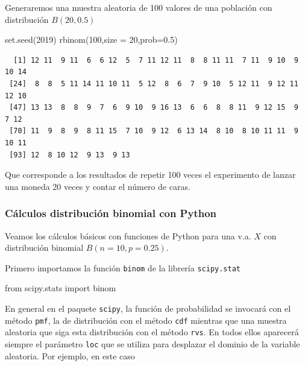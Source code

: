 \documentclass[
  letterpaper,
  DIV=11,
  numbers=noendperiod]{scrreprt}
\newenvironment{Shaded}{\begin{snugshade}}{\end{snugshade}}
\newcommand{\AttributeTok}[1]{\textcolor[rgb]{0.40,0.45,0.13}{#1}}
\newcommand{\DecValTok}[1]{\textcolor[rgb]{0.68,0.00,0.00}{#1}}
\newcommand{\FloatTok}[1]{\textcolor[rgb]{0.68,0.00,0.00}{#1}}
\newcommand{\FunctionTok}[1]{\textcolor[rgb]{0.28,0.35,0.67}{#1}}
\newcommand{\ImportTok}[1]{\textcolor[rgb]{0.00,0.46,0.62}{#1}}
\newcommand{\NormalTok}[1]{\textcolor[rgb]{0.00,0.23,0.31}{#1}}
\begin{document}
Generaremos una muestra aleatoria de 100 valores de una población con
distribución \(B(20,0.5)\)

\begin{Shaded}
\begin{Highlighting}[]
\FunctionTok{set.seed}\NormalTok{(}\DecValTok{2019}\NormalTok{)}
\FunctionTok{rbinom}\NormalTok{(}\DecValTok{100}\NormalTok{,}\AttributeTok{size =} \DecValTok{20}\NormalTok{,}\AttributeTok{prob=}\FloatTok{0.5}\NormalTok{)}
\end{Highlighting}
\end{Shaded}

\begin{verbatim}
  [1] 12 11  9 11  6  6 12  5  7 11 12 11  8  8 11 11  7 11  9 10  9 10 14
 [24]  8  8  5 11 14 11 10 11  5 12  8  6  7  9 10  5 12 11  9 12 11 12 10
 [47] 13 13  8  8  9  7  6  9 10  9 16 13  6  6  8  8 11  9 12 15  9  7 12
 [70] 11  9  8  9  8 11 15  7 10  9 12  6 13 14  8 10  8 10 11 11  9 10 11
 [93] 12  8 10 12  9 13  9 13
\end{verbatim}

Que corresponde a los resultados de repetir 100 veces el experimento de
lanzar una moneda 20 veces y contar el número de caras.

\subsubsection{Cálculos distribución binomial con
Python}\label{cuxe1lculos-distribuciuxf3n-binomial-con-python}

Veamos los cálculos básicos con funciones de Python para una v.a. \(X\)
con distribución binomial \(B(n=10,p=0.25)\).

Primero importamos la función \texttt{binom} de la librería
\texttt{scipy.stat}

\begin{Shaded}
\begin{Highlighting}[]
\ImportTok{from}\NormalTok{ scipy.stats }\ImportTok{import}\NormalTok{ binom}
\end{Highlighting}
\end{Shaded}

En general en el paquete \texttt{scipy}, la función de probabilidad se
invocará con el método \texttt{pmf}, la de distribución con el método
\texttt{cdf} mientras que una muestra aleatoria que siga esta
distribución con el método \texttt{rvs}. En todos ellos aparecerá
siempre el parámetro \texttt{loc} que se utiliza para desplazar el
dominio de la variable aleatoria. Por ejemplo, en este caso
\end{document}
